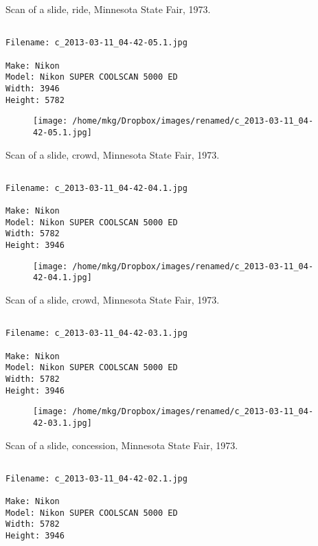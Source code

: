\clearpage
\onecolumn
\noindent Scan of a slide, ride, Minnesota State Fair, 1973.
\noindent
\begin{lstlisting}

Filename: c_2013-03-11_04-42-05.1.jpg

Make: Nikon
Model: Nikon SUPER COOLSCAN 5000 ED
Width: 3946
Height: 5782
\end{lstlisting}
\clearpage

\begin{figure}
\texttt{[image: /home/mkg/Dropbox/images/renamed/c\_2013-03-11\_04-42-05.1.jpg]}
\end{figure}
    
\clearpage
\onecolumn
\noindent Scan of a slide, crowd, Minnesota State Fair, 1973.
\noindent
\begin{lstlisting}

Filename: c_2013-03-11_04-42-04.1.jpg

Make: Nikon
Model: Nikon SUPER COOLSCAN 5000 ED
Width: 5782
Height: 3946
\end{lstlisting}
\clearpage

\begin{figure}
\texttt{[image: /home/mkg/Dropbox/images/renamed/c\_2013-03-11\_04-42-04.1.jpg]}
\end{figure}
    
\clearpage
\onecolumn
\noindent Scan of a slide, crowd, Minnesota State Fair, 1973.
\noindent
\begin{lstlisting}

Filename: c_2013-03-11_04-42-03.1.jpg

Make: Nikon
Model: Nikon SUPER COOLSCAN 5000 ED
Width: 5782
Height: 3946
\end{lstlisting}
\clearpage

\begin{figure}
\texttt{[image: /home/mkg/Dropbox/images/renamed/c\_2013-03-11\_04-42-03.1.jpg]}
\end{figure}
    
\clearpage
\onecolumn
\noindent Scan of a slide, concession, Minnesota State Fair, 1973.
\noindent
\begin{lstlisting}

Filename: c_2013-03-11_04-42-02.1.jpg

Make: Nikon
Model: Nikon SUPER COOLSCAN 5000 ED
Width: 5782
Height: 3946
\end{lstlisting}
\clearpage

